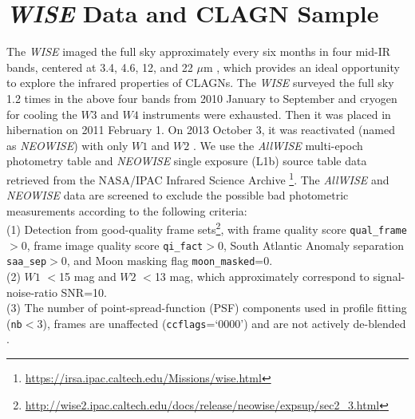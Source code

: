 \documentclass[linenumbers]{aastex631}
\begin{document}
\section{{\it WISE} Data and CLAGN Sample} \label{sec:sample}
The \textit{WISE} imaged the full sky approximately every six months in four mid-IR bands, centered at 3.4, 4.6, 12, and 22 $\mu$m \citep[referred to as $W1$, $W2$, $W3$, and $W4$, respectively,][]{2010AJ....140.1868W}, which provides an ideal opportunity to explore the infrared properties of CLAGNs. The {\it WISE} surveyed the full sky 1.2 times in the above four bands from 2010 January to September and cryogen for cooling the $W3$ and $W4$ instruments were exhausted. Then it was placed in hibernation on 2011 February 1. On 2013 October 3, it was reactivated (named as \textit{NEOWISE}) with only $W1$ and $W2$ \citep{2014ApJ...792...30M}. We use the \textit{AllWISE} multi-epoch photometry table and \textit{NEOWISE} single exposure (L1b) source table data retrieved from the NASA/IPAC Infrared Science Archive \footnote{\url{https://irsa.ipac.caltech.edu/Missions/wise.html}}. The \textit{AllWISE} and \textit{NEOWISE} data are screened to exclude the possible bad photometric measurements according to the following criteria:\\
(1) Detection from good-quality frame sets\footnote{\url{http://wise2.ipac.caltech.edu/docs/release/neowise/expsup/sec2_3.html}}, with {frame quality score \texttt{qual\_frame}}$>$0, frame image quality score {\texttt{qi\_fact}}$>$0,
South Atlantic Anomaly separation {\texttt{saa\_sep}}$>0$, and Moon masking
flag {\texttt{moon\_masked}}=0.\\ 
(2) $W1$ $<$15 mag and $W2$ $<$13 mag, which approximately correspond to signal-noise-ratio SNR=10.\\
(3) The number of point-spread-function (PSF) components used in profile fitting (\texttt{nb}$<$3), frames are unaffected (\texttt{cc\textunderscore flags}=`0000') and are not actively de-blended \citep[na$=$0; see also][]{2019MNRAS.483.2362R}.
\end{document}
